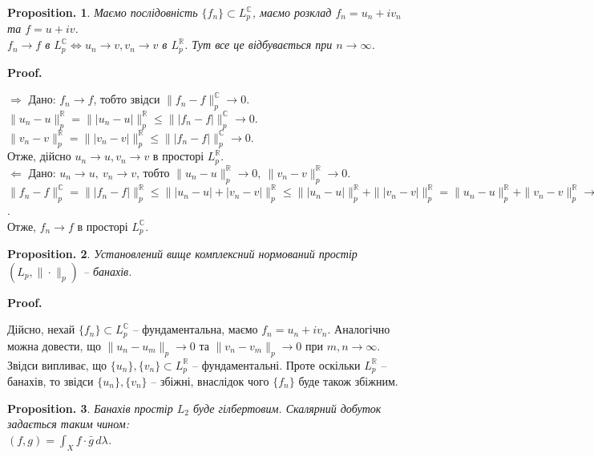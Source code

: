 \documentclass[a4paper, 10pt]{article}
\makeatletter
\def\rightproof{$\boxed{\Rightarrow}$ }
\def\leftproof{$\boxed{\Leftarrow}$ }
\theoremstyle{theoremdd}
\newtheorem*{proposition*}{Proposition.}
\renewenvironment{proof}[1][Proof.\\]{\par
\pushQED{\hfill \qed}%
\normalfont \topsep6\p@\@plus6\p@\relax
\trivlist
\item\relax
{\bfseries
#1\@addpunct{.}}\hspace\labelsep\ignorespaces
}{%
\popQED\endtrivlist\@endpefalse
}
\makeatother
\begin{document}
\begin{proposition*}
Маємо послідовність $\{f_n\} \subset L_p^{\mathbb{C}}$, маємо розклад $f_n = u_n + iv_n$ та $f = u + iv$.\\
$f_n \to f$ в $L_p^{\mathbb{C}} \iff u_n \to v, v_n \to v$ в $L_p^{\mathbb{R}}$. Тут все це відбувається при $n \to \infty$.
\end{proposition*}

\begin{proof}
\rightproof Дано: $f_n \to f$, тобто звідси $\|f_n-f\|_p^{\mathbb{C}} \to 0$.\\
$\| u_n - u\|_p^{\mathbb{R}} = \| |u_n - u| \|_p^{\mathbb{R}} \leq \| |f_n-f| \|_p^{\mathbb{C}} \to 0$.\\
$\| v_n - v\|_p^{\mathbb{R}} = \| |v_n -v| \|_p^{\mathbb{R}} \leq \| |f_n-f| \|_p^{\mathbb{C}} \to 0$.\\
Отже, дійсно $u_n \to u, v_n \to v$ в просторі $L_p^{\mathbb{R}}$.
\bigskip \\
\leftproof Дано: $u_n \to u,\ v_n \to v$, тобто $\|u_n-u\|_p^{\mathbb{R}} \to 0,\ \|v_n - v\|_p^{\mathbb{R}} \to 0$.\\
$\|f_n - f\|_p^{\mathbb{C}} = \| |f_n - f| \|_p^{\mathbb{R}} \leq \| |u_n - u| + |v_n - v| \|_{p}^{\mathbb{R}} \leq \| |u_n - u| \|_p^{\mathbb{R}} + \| |v_n - v| \|_p^{\mathbb{R}} = \| u_n - u \|_p^{\mathbb{R}} + \| v_n - v \|_p^{\mathbb{R}} \to 0$.\\
Отже, $f_n \to f$ в просторі $L_p^{\mathbb{C}}$.
\end{proof}

\begin{proposition*}
Установлений вище комплексний нормований простір $(L_p, \| \cdot \|_p)$ -- банахів.
\end{proposition*}

\begin{proof}
Дійсно, нехай $\{f_n\} \subset L_p^{\mathbb{C}}$ -- фундаментальна, маємо $f_n = u_n + i v_n$. Аналогічно можна довести, що $\| u_n - u_m \|_p \to 0$ та $\| v_n - v_m \|_p \to 0$ при $m,n \to \infty$. Звідси випливає, що $\{u_n\}, \{v_n\} \subset L_p^{\mathbb{R}}$ -- фундаментальні. Проте оскільки $L_p^{\mathbb{R}}$ -- банахів, то звідси $\{u_n\}, \{v_n\}$ -- збіжні, внаслідок чого $\{f_n\}$ буде також збіжним.
\end{proof}

\begin{proposition*}
Банахів простір $L_2$ буде гілбертовим. Скалярний добуток задається таким чином:\\
$(f,g) = \displaystyle\int_X f \cdot \bar{g}\,d\lambda$.
\end{proposition*}
\end{document}
